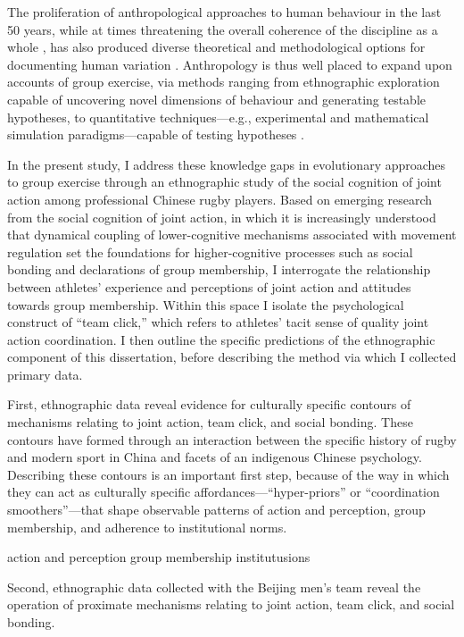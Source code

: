 The proliferation of anthropological approaches to human behaviour in the last 50 years, while at times threatening the overall coherence of the discipline as a whole \citep{Beller2012}, has also produced diverse theoretical and methodological options for documenting human variation \citep{Fuentes2016a}.
Anthropology is thus well placed to expand upon accounts of group exercise, via methods ranging from ethnographic exploration capable of uncovering novel dimensions of behaviour and generating testable hypotheses, to quantitative techniques---e.g., experimental and mathematical simulation paradigms---capable of testing hypotheses \citep{Epstein2006,Fuentes2016}.

In the present study, I address these knowledge gaps in evolutionary approaches to group exercise through an ethnographic study of the social cognition of joint action among professional Chinese rugby players.  Based on emerging research from the social cognition of joint action, in which it is increasingly understood that dynamical coupling of lower-cognitive mechanisms associated with movement regulation set the foundations for higher-cognitive processes such as social bonding and declarations of group membership, I interrogate the relationship between athletes' experience and perceptions of joint action and attitudes towards group membership.  Within this space I isolate the psychological construct of ``team click,'' which refers to athletes' tacit sense of quality joint action coordination.   I then outline the specific predictions of the ethnographic component of this dissertation, before describing the method via which I collected primary data.


First, ethnographic data reveal evidence for culturally specific contours of mechanisms relating to joint action, team click, and social bonding.  These contours have formed through an interaction between the specific history of rugby and modern sport in China and facets of an indigenous Chinese psychology.  Describing these contours is an important first step, because of the way in which they can act as culturally specific affordances---``hyper-priors'' or ``coordination smoothers''---that shape observable patterns of action and perception, group membership, and adherence to institutional norms.

action and perception
group membership
institutusions

Second, ethnographic data collected with the Beijing men's team reveal the operation of proximate mechanisms relating to joint action, team click, and social bonding.

